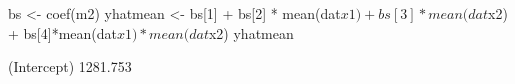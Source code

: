 \begin{Schunk}
\begin{Sinput}
 bs <- coef(m2)
 yhatmean <- bs[1] + bs[2] * mean(dat$x1) + bs[3] * mean(dat$x2) + bs[4]*mean(dat$x1)*mean(dat$x2)
 yhatmean
\end{Sinput}
\begin{Soutput}
(Intercept) 
   1281.753 
\end{Soutput}
\end{Schunk}
